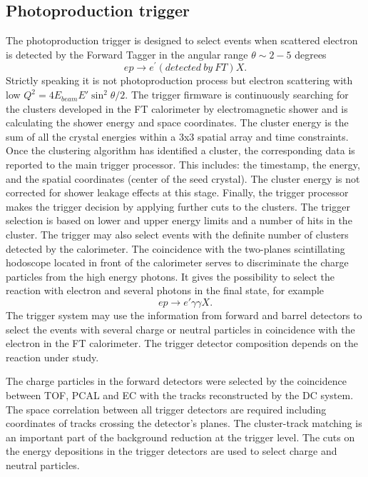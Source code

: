 \subsection{Photoproduction trigger}
The photoproduction trigger is designed to select  events when scattered electron is detected by the Forward Tagger in the angular range $\theta\sim2-5$ degrees
$$
e p  \rightarrow e^\prime(detected\ by\ FT) X.
$$
\noindent
Strictly speaking it is not photoproduction process but electron scattering with  low $Q^2=4E_{beam}E'\sin^2\theta/2$.
The trigger firmware is continuously searching for the clusters developed in the FT calorimeter by electromagnetic shower and is calculating the shower energy and space coordinates. 
The cluster energy is the sum of all the
crystal energies within a 3x3 spatial array and time constraints. Once
the clustering algorithm  has identified a cluster, the
corresponding data is reported to the main trigger processor. This
includes: the timestamp, the energy, and the spatial coordinates (center
of the seed crystal). The cluster energy is not corrected for shower
leakage effects at this stage. Finally, the trigger processor makes the
trigger decision by applying further cuts to the clusters. The trigger  selection is based on lower and upper energy limits and a number of hits in the cluster. The trigger may also select events with the definite number of clusters detected by the calorimeter. 
The coincidence with the two-planes  scintillating hodoscope   located in front of the calorimeter serves to discriminate the charge particles from the high energy photons. 
It gives the possibility to select the reaction with electron and several photons in the final state, for example
$$
ep\to e'\gamma\gamma X.
$$
\noindent
The trigger system may use the  information from forward and barrel detectors to select the events with several charge or neutral particles in coincidence with the electron in the FT calorimeter. The trigger detector composition depends on the reaction under study. 

The charge particles in the forward detectors  were selected by the coincidence between TOF, PCAL and EC with the tracks reconstructed by the DC system. The space correlation between all trigger detectors are required including coordinates 
 of tracks crossing the detector's planes. The cluster-track matching is an important part of the background reduction at the trigger level. The cuts on the energy depositions in the trigger detectors are used to select charge and neutral particles. 
 
